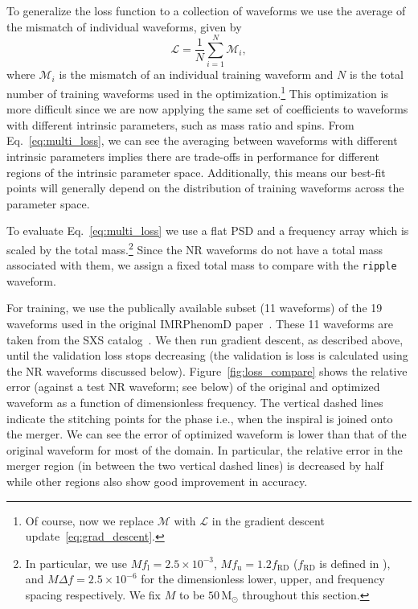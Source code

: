 \documentclass[twocolumn]{aastex631}
\newcommand{\ripple}{\texttt{ripple}\xspace}
\begin{document}
To generalize the loss function to a collection of waveforms we use the average of the mismatch of individual waveforms, given by
\begin{equation}
	\mathcal{L}=\frac{1}{N}\sum_{i=1}^{N}\mathcal{M}_i,
    \label{eq:multi_loss}
\end{equation}
where $\mathcal{M}_i$ is the mismatch of an individual training waveform and $N$ is the total number of training waveforms used in the optimization.\footnote{
    Of course, now we replace $\mathcal{M}$ with $\mathcal{L}$ in the gradient descent update~\eqref{eq:grad_descent}.
}
This optimization is more difficult since we are now applying the same set of coefficients to waveforms with different intrinsic parameters, such as mass ratio and spins. 
From Eq.~\eqref{eq:multi_loss}, we can see the averaging between waveforms with different intrinsic parameters implies there are trade-offs in performance for different regions of the intrinsic parameter space. 
Additionally, this means our best-fit points will generally depend on the distribution of training waveforms across the parameter space.

To evaluate Eq.~\eqref{eq:multi_loss} we use a flat PSD and a frequency array which is scaled by the total mass.\footnote{
    In particular, we use $M f_{\mathrm{l}} = 2.5 \times 10^{-3}$, $M f_{\mathrm{u}} = 1.2 f_{\textrm{RD}}$ ($f_{\textrm{RD}}$ is defined in \cite{Khan:2015jqa}), and $M\Delta f = 2.5 \times 10^{-6}$ for the dimensionless lower, upper, and frequency spacing respectively. We fix $M$ to be $50\,\mathrm{M}_\odot$ throughout this section.
}
Since the NR waveforms do not have a total mass associated with them, we assign a fixed total mass to compare with the \ripple waveform.

For training, we use the publically available subset (11 waveforms) of the 19 waveforms used in the original IMRPhenomD paper~\citep{Khan:2015jqa}. 
These 11 waveforms are taken from the SXS catalog~\citep{Boyle:2019kee}.
We then run gradient descent, as described above, until the validation loss stops decreasing (the validation is loss is calculated using the NR waveforms discussed below). 
Figure~\ref{fig:loss_compare} shows the relative error (against a test NR waveform; see below) of the original and optimized waveform as a function of dimensionless frequency.
The vertical dashed lines indicate the stitching points for the phase i.e., when the inspiral is joined onto the merger.
We can see the error of optimized waveform is lower than that of the original waveform for most of the domain.
In particular, the relative error in the merger region (in between the two vertical dashed lines) is decreased by half while other regions also show good improvement in accuracy. 
\end{document}
